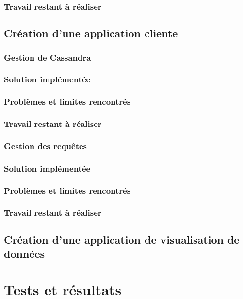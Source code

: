 \documentclass[12pt]{article}
\begin{document}
\subsubsection*{Travail restant à réaliser}



\subsection{Création d'une application cliente}

\subsubsection{Gestion de Cassandra}

\subsubsection*{Solution implémentée}
\subsubsection*{Problèmes et limites rencontrés}
\subsubsection*{Travail restant à réaliser}

\subsubsection{Gestion des requêtes}

\subsubsection*{Solution implémentée}
\subsubsection*{Problèmes et limites rencontrés}
\subsubsection*{Travail restant à réaliser}

\subsection{Création d'une application de visualisation de données}

\section{Tests et résultats}
\end{document}
